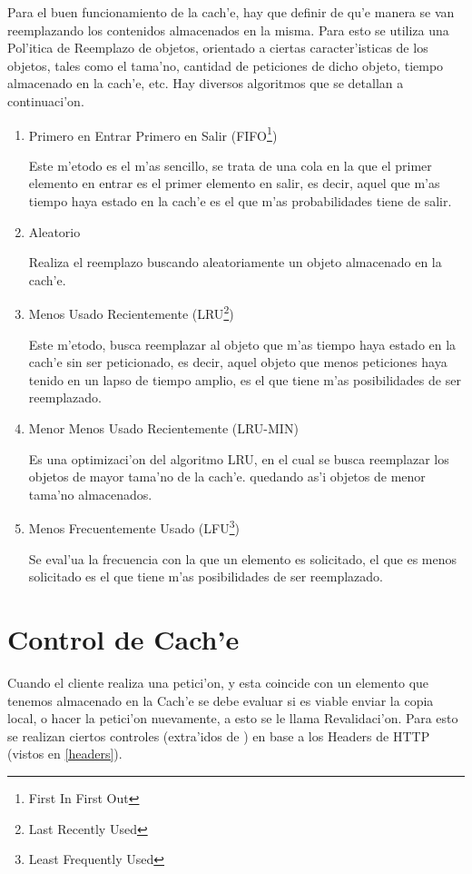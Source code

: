 Para el buen funcionamiento de la cach'e, hay que definir de qu'e manera se van reemplazando los contenidos almacenados en la misma. Para esto se utiliza una Pol'itica de Reemplazo de objetos, orientado a ciertas caracter'isticas de los objetos, tales como el tama'no, cantidad de peticiones de dicho objeto, tiempo almacenado en la cach'e, etc.
Hay diversos algoritmos que se detallan a continuaci'on.
\begin{enumerate}
\item Primero en Entrar Primero en Salir (FIFO\footnote{First In First Out})

Este m'etodo es el m'as sencillo, se trata de una cola en la que el primer elemento en entrar es el primer elemento en salir, es decir, aquel que m'as tiempo haya estado en la cach'e es el que m'as probabilidades tiene de salir.
\item Aleatorio

Realiza el reemplazo buscando aleatoriamente un objeto almacenado en la cach'e.
\item Menos Usado Recientemente (LRU\footnote{Last Recently Used})

Este m'etodo, busca reemplazar al objeto que m'as tiempo haya estado en la cach'e sin ser peticionado, es decir, aquel objeto que menos peticiones haya tenido en un lapso de tiempo amplio, es el que tiene m'as posibilidades de ser reemplazado.
\item Menor Menos Usado Recientemente (LRU-MIN)

Es una optimizaci'on del algoritmo LRU, en el cual se busca reemplazar los objetos de mayor tama'no de la cach'e. quedando as'i objetos de menor tama'no almacenados.
\item Menos Frecuentemente Usado (LFU\footnote{Least Frequently Used})

Se eval'ua la frecuencia con la que un elemento es solicitado, el que es menos solicitado es el que tiene m'as posibilidades de ser reemplazado.
\end{enumerate}

\section{Control de Cach'e}
\label{controlCache}

Cuando el cliente realiza una petici'on, y esta coincide con un elemento que tenemos almacenado en la Cach'e se debe evaluar si es viable enviar la copia local, o hacer la petici'on nuevamente, a esto se le llama Revalidaci'on. Para esto se realizan ciertos controles (extra'idos de \citep{cacheDef}) en base a los Headers de HTTP (vistos en \ref{headers}).

